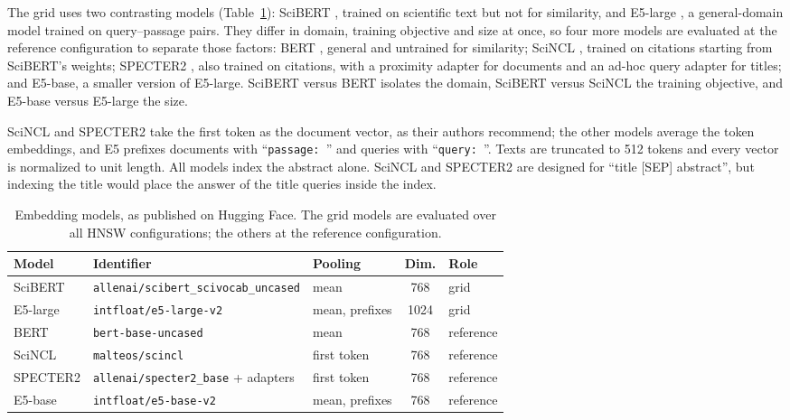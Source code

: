 \documentclass[runningheads]{llncs}
\begin{document}
The grid uses two contrasting models (Table~\ref{tab:modelspec}): SciBERT \cite{ref18},
trained on scientific text but not for similarity, and E5-large \cite{ref19}, a
general-domain model trained on query--passage pairs. They differ in domain, training
objective and size at once, so four more models are evaluated at the reference configuration
to separate those factors: BERT \cite{devlin2019}, general and untrained for similarity;
SciNCL \cite{ostendorff2022}, trained on citations starting from SciBERT's weights; SPECTER2
\cite{singh2023}, also trained on citations, with a proximity adapter for documents and an
ad-hoc query adapter for titles; and E5-base, a smaller version of E5-large. SciBERT versus
BERT isolates the domain, SciBERT versus SciNCL the training objective, and E5-base versus
E5-large the size.

SciNCL and SPECTER2 take the first token as the document vector, as their authors recommend;
the other models average the token embeddings, and E5 prefixes documents with
``\texttt{passage: }'' and queries with ``\texttt{query: }''. Texts are truncated to 512 tokens
and every vector is normalized to unit length. All models index the abstract alone. SciNCL and
SPECTER2 are designed for ``title [SEP] abstract'', but indexing the title would place the
answer of the title queries inside the index.

\begin{table}[tbp]
\caption{Embedding models, as published on Hugging Face. The grid models are evaluated over
all HNSW configurations; the others at the reference configuration.}\label{tab:modelspec}
\centering
\small
\begin{tabular}{|l|l|l|c|l|}
\hline
\textbf{Model} & \textbf{Identifier} & \textbf{Pooling} & \textbf{Dim.} & \textbf{Role} \\
\hline
SciBERT & \texttt{allenai/scibert\_scivocab\_uncased} & mean & 768 & grid \\
E5-large & \texttt{intfloat/e5-large-v2} & mean, prefixes & 1024 & grid \\
BERT & \texttt{bert-base-uncased} & mean & 768 & reference \\
SciNCL & \texttt{malteos/scincl} & first token & 768 & reference \\
SPECTER2 & \texttt{allenai/specter2\_base} + adapters & first token & 768 & reference \\
E5-base & \texttt{intfloat/e5-base-v2} & mean, prefixes & 768 & reference \\
\hline
\end{tabular}
\end{table}
\end{document}
